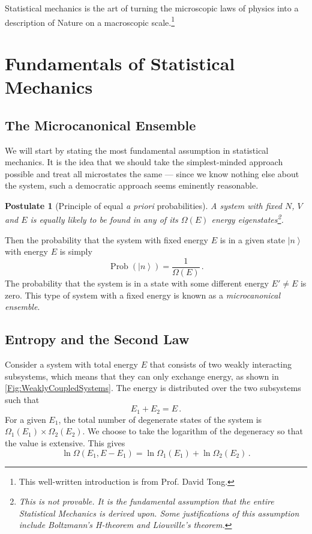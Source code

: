 \documentclass{article}
\theoremstyle{plain}\theoremheaderfont{\normalfont\bfseries}\theorembodyfont{\rmfamily}\theoremseparator{.}\newtheorem*{thm}{Theorem}\newtheorem*{law}{Law}\newtheorem*{pos}{Postulate}
\numberwithin{equation}{section}
\newcommand{\ket}[1]{\left| #1 \right\rangle}
\DeclareMathOperator{\Prob}{Prob}
\begin{document}
    Statistical mechanics is the art of turning the microscopic laws of physics into a description of Nature on a macroscopic scale.\footnote{This well-written introduction is from Prof. David Tong.}

    \newpage
    \section{Fundamentals of Statistical Mechanics}
    \subsection{The Microcanonical Ensemble}
    We will start by stating the most fundamental assumption in statistical mechanics. It is the idea that we should take the simplest-minded approach possible and treat all microstates the same --- since we know nothing else about the system, such a democratic approach seems eminently reasonable.
    \begin{pos}[Principle of equal \textit{a priori} probabilities]
        A system with fixed \(N\), \(V\) and \(E\) is equally likely to be found in any of its \(\Omega(E)\) energy eigenstates\footnote{This is not provable. It is the fundamental assumption that the entire Statistical Mechanics is derived upon. Some justifications of this assumption include Boltzmann's H-theorem and Liouville's theorem.}.
    \end{pos}

    Then the probability that the system with fixed energy \(E\) is in a given state \(\ket{n}\) with energy \(E\) is simply
    \begin{equation}
        \Prob(\ket{n})=\frac{1}{\Omega(E)}\,.
    \end{equation}
    The probability that the system is in a state with some different energy \(E'\ne E\) is zero. This type of system with a fixed energy is known as a \textit{microcanonical ensemble}.

    \subsection{Entropy and the Second Law}
    Consider a system with total energy \(E\) that consists of two weakly interacting subsystems, which means that they can only exchange energy, as shown in \cref{Fig:WeaklyCoupledSystems}. The energy is distributed over the two subsystems such that
    \begin{equation}
        E_1+E_2=E\,.
    \end{equation}
    For a given \(E_1\), the total number of degenerate states of the system is \(\Omega_1(E_1)\times\Omega_2(E_2)\). We choose to take the logarithm of the degeneracy so that the value is extensive. This gives
    \begin{equation}
        \ln\Omega(E_1,E-E_1)=\ln\Omega_1(E_1)+\ln\Omega_2(E_2)\,.
    \end{equation}
\end{document}
